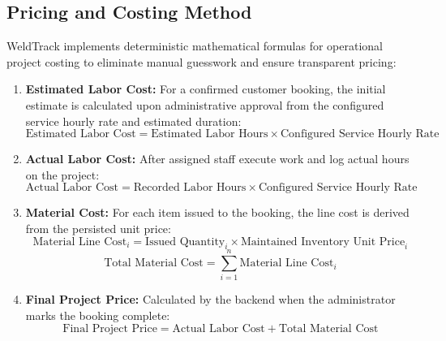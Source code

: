 \documentclass[12pt, letterpaper]{article}
\begin{document}
\subsection*{Pricing and Costing Method}
\hspace*{2em} WeldTrack implements deterministic mathematical formulas for operational project costing to eliminate manual guesswork and ensure transparent pricing:
\begin{enumerate}[label=\alph*.]
    \item \textbf{Estimated Labor Cost:} For a confirmed customer booking, the initial estimate is calculated upon administrative approval from the configured service hourly rate and estimated duration:
    \begin{equation}
    \text{Estimated Labor Cost} = \text{Estimated Labor Hours} \times \text{Configured Service Hourly Rate}
    \end{equation}
    \item \textbf{Actual Labor Cost:} After assigned staff execute work and log actual hours on the project:
    \begin{equation}
    \text{Actual Labor Cost} = \text{Recorded Labor Hours} \times \text{Configured Service Hourly Rate}
    \end{equation}
    \item \textbf{Material Cost:} For each item issued to the booking, the line cost is derived from the persisted unit price:
    \begin{equation}
    \text{Material Line Cost}_i = \text{Issued Quantity}_i \times \text{Maintained Inventory Unit Price}_i
    \end{equation}
    \begin{equation}
    \text{Total Material Cost} = \sum_{i=1}^{n} \text{Material Line Cost}_i
    \end{equation}
    \item \textbf{Final Project Price:} Calculated by the backend when the administrator marks the booking complete:
    \begin{equation}
    \text{Final Project Price} = \text{Actual Labor Cost} + \text{Total Material Cost}
    \end{equation}
\end{enumerate}
\end{document}
